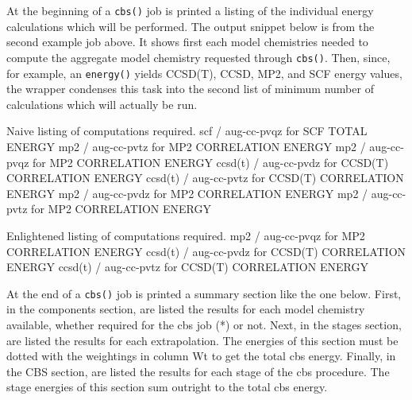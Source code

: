 
At the beginning of a \texttt{cbs()} job is printed a listing of the individual energy
calculations which will be performed. The output snippet below is from the second example
job above. It shows first each model chemistries
needed to compute the aggregate model chemistry requested through \texttt{cbs()}. Then,
since, for example, an \texttt{energy()} yields CCSD(T), CCSD, MP2, and SCF
energy values, the wrapper condenses this task into the second list of minimum number of
calculations which will actually be run.

\begin{Snippet}
    Naive listing of computations required.
            scf / aug-cc-pvqz              for  SCF TOTAL ENERGY
            mp2 / aug-cc-pvtz              for  MP2 CORRELATION ENERGY
            mp2 / aug-cc-pvqz              for  MP2 CORRELATION ENERGY
        ccsd(t) / aug-cc-pvdz              for  CCSD(T) CORRELATION ENERGY
        ccsd(t) / aug-cc-pvtz              for  CCSD(T) CORRELATION ENERGY
            mp2 / aug-cc-pvdz              for  MP2 CORRELATION ENERGY
            mp2 / aug-cc-pvtz              for  MP2 CORRELATION ENERGY

    Enlightened listing of computations required.
            mp2 / aug-cc-pvqz              for  MP2 CORRELATION ENERGY
        ccsd(t) / aug-cc-pvdz              for  CCSD(T) CORRELATION ENERGY
        ccsd(t) / aug-cc-pvtz              for  CCSD(T) CORRELATION ENERGY
\end{Snippet}

At the end of a \texttt{cbs()} job is printed a summary section like the one below. First,
in the components section, are listed the results for each model chemistry available, whether
required for the cbs job (*) or not. Next, in the stages section, are listed the results for
each extrapolation. The energies of this section must be dotted with the weightings in column Wt
to get the total cbs energy. Finally, in the CBS section, are listed the results for each stage
of the cbs procedure. The stage energies of this section sum outright to the total cbs energy.

